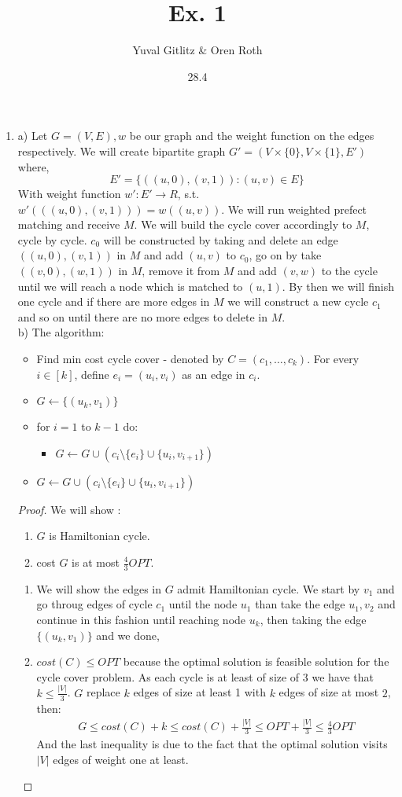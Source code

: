 \documentclass{article}
\title{Ex. 1}
\author{Yuval Gitlitz \& Oren Roth}
\date{28.4}
\begin{document}
\maketitle

\begin{enumerate}
	\item
a) Let $G=(V,E),w$ be our graph and the weight function on the edges respectively. We will create bipartite graph $G'=(V\times \{0\},V\times \{1\},E')$ where,
$$E' = \{((u,0),(v,1)): (u,v)\in E \}$$
With weight function $w':E'\rightarrow R$, s.t. $w'(((u,0),(v,1))) = w((u,v))$. We will run weighted prefect matching and receive $M$. We will build the cycle cover accordingly to $M$, cycle by cycle. $c_0$ will be constructed by taking and delete an edge $((u,0),(v,1))$ in $M$ and add $(u,v)$ to $c_0$, go on by take $((v,0),(w,1))$ in $M$, remove it from $M$ and add $(v,w)$ to the cycle until we will reach a node which is matched to $(u,1)$. By then we will finish one cycle and if there are more edges in $M$ we will construct a new cycle $c_1$ and so on until there are no more edges to delete in $M$.
\\ 
b) The algorithm:
\begin{itemize}
	\item Find min cost cycle cover - denoted by $C = (c_1,\ldots,c_k)$. For every $i \in [k]$, define $e_i = (u_i,v_i)$ as an edge in $c_i$.
	\item $G\leftarrow \{(u_k,v_1)\}$
	\item for $i=1$ to $k-1$ do:
	\begin{itemize}
		\item $G \leftarrow G \cup (c_i \setminus \{e_i\} \cup \{u_i,v_{i+1}\})$
	\end{itemize}
	\item $G \leftarrow G \cup (c_i \setminus \{e_i\} \cup \{u_i,v_{i+1}\})$
\end{itemize}
\begin{proof}
We will show :
\begin{enumerate}[I]
	\item $G$ is Hamiltonian cycle. 
	\item cost $G$ is at most $\frac{4}{3}OPT$. 
\end{enumerate}
\begin{enumerate}[I]
	\item We will show the edges in $G$ admit Hamiltonian cycle. We start by $v_1$ and go throug edges of cycle $c_1$ until the node $u_1$ than take the edge $u_1,v_2$ and continue in this fashion until reaching node $u_k$, then taking the edge $\{(u_k,v_1)\}$ and we done,
	\item $cost(C) \le OPT$ because the optimal solution is feasible solution for the cycle cover problem. 
	As each cycle is at least of size of 3 we have that $k\le \frac{|V|}{3}$. $G$ replace $k$ edges of size at least 1 with $k$ edges of size at most $2$, then:
	\begin{align*}
	G \le cost(C) + k \le cost(C) + \frac{|V|}{3} \le OPT +\frac{|V|}{3} \le \frac{4}{3}OPT
	\end{align*}
	And the last inequality is due to the fact that the optimal solution visits $|V|$ edges of weight one at least. 
	

\end{enumerate}
\end{proof}
\end{enumerate}
\end{document}
